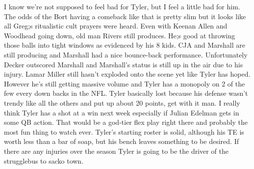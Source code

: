 \documentclass[11pt,letterpaper]{article}
\begin{document}
\par\noindent I know we're not supposed to feel bad for Tyler, but I feel a little bad for him. The odds of the Bort having a comeback like that is pretty slim but it looks like all Greg;s ritualistic cult prayers were heard. Even with Keenan Allen and Woodhead going down, old man Rivers still produces. He;s good at throwing those balls into tight windows as evidenced by his 8 kids. CJA and Marshall are still producing and Marshall had a nice bounce-back performance. Unfortunately Decker outscored Marshall and Marshall's status is still up in the air due to his injury. Lamar Miller still hasn't exploded onto the scene yet like Tyler has hoped. However he's still getting massive volume and Tyler has a monopoly on 2 of the few every down backs in the NFL. Tyler basically lost because his defense wasn't trendy like all the others and put up about 20 points, get with it man. I really think Tyler has a shot at a win next week especially if Julian Edelman gets in some QB action. That would be a god-tier flex play right there and probably the most fun thing to watch ever. Tyler's starting roster is solid, although his TE is worth less than a bar of soap, but his bench leaves something to be desired. If there are any injuries over the season Tyler is going to be the driver of the strugglebus to sacko town.
\end{document}
